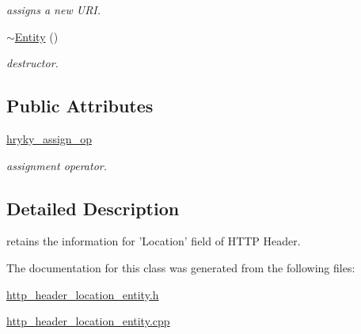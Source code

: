 \begin{DoxyCompactItemize}
\begin{DoxyCompactList}\small\item\em assigns a new U\-R\-I. \end{DoxyCompactList}\item 
\hypertarget{classhryky_1_1http_1_1header_1_1location_1_1_entity_a92560267526dc1a1dd0e6f9bfb2aaaff}{\hyperlink{classhryky_1_1http_1_1header_1_1location_1_1_entity_a92560267526dc1a1dd0e6f9bfb2aaaff}{$\sim$\-Entity} ()}\label{classhryky_1_1http_1_1header_1_1location_1_1_entity_a92560267526dc1a1dd0e6f9bfb2aaaff}

\begin{DoxyCompactList}\small\item\em destructor. \end{DoxyCompactList}\end{DoxyCompactItemize}
\subsection*{Public Attributes}
\begin{DoxyCompactItemize}
\item 
\hypertarget{classhryky_1_1http_1_1header_1_1location_1_1_entity_a1a819958215d08a3d71f68f770ee09c1}{\hyperlink{classhryky_1_1http_1_1header_1_1location_1_1_entity_a1a819958215d08a3d71f68f770ee09c1}{hryky\-\_\-assign\-\_\-op}}\label{classhryky_1_1http_1_1header_1_1location_1_1_entity_a1a819958215d08a3d71f68f770ee09c1}

\begin{DoxyCompactList}\small\item\em assignment operator. \end{DoxyCompactList}\end{DoxyCompactItemize}


\subsection{Detailed Description}
retains the information for 'Location' field of H\-T\-T\-P Header. 

The documentation for this class was generated from the following files\-:\begin{DoxyCompactItemize}
\item 
\hyperlink{http__header__location__entity_8h}{http\-\_\-header\-\_\-location\-\_\-entity.\-h}\item 
\hyperlink{http__header__location__entity_8cpp}{http\-\_\-header\-\_\-location\-\_\-entity.\-cpp}\end{DoxyCompactItemize}
